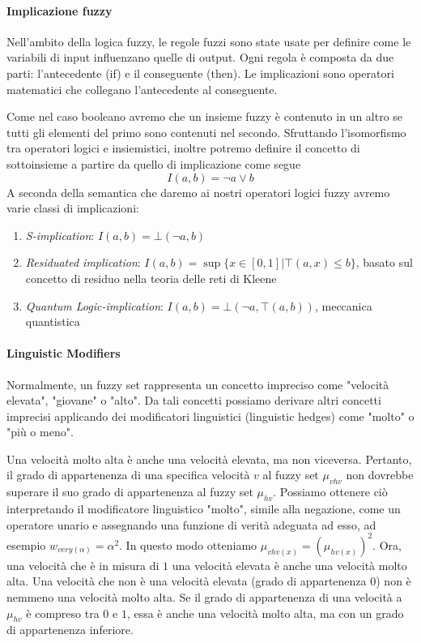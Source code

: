 \paragraph{Implicazione fuzzy}
Nell'ambito della logica fuzzy, le regole fuzzi sono state usate per definire come le variabili di input influenzano quelle di output. Ogni regola è composta da due parti: l'antecedente (if) e il conseguente (then). Le implicazioni sono operatori matematici che collegano l'antecedente al conseguente.

Come nel caso booleano avremo che un insieme fuzzy è contenuto in un altro se tutti gli elementi del primo sono contenuti nel secondo. Sfruttando l’isomorfismo tra operatori logici e insiemistici, inoltre potremo definire il concetto di sottoinsieme a partire da quello di implicazione come segue
$$I(a,b) = \neg a \vee b$$
A seconda della semantica che daremo ai nostri operatori logici fuzzy avremo varie classi di implicazioni:
\begin{enumerate}
    \item{\textit{S-implication}: $I(a,b) = \bot(\neg a, b)$}
    \item{\textit{Residuated implication}: $I(a,b) = \sup \{x \in [0,1] | \top(a,x) \leq b\}$}, basato sul concetto di residuo nella teoria delle reti di Kleene
    \item{\textit{Quantum Logic-implication}: $I(a,b) = \bot(\neg a, \top(a,b))$}, meccanica quantistica
\end{enumerate}

\paragraph{Linguistic Modifiers}
Normalmente, un fuzzy set rappresenta un concetto impreciso come "velocità elevata", "giovane" o "alto". Da tali concetti possiamo derivare altri concetti imprecisi applicando dei modificatori linguistici (linguistic hedges) come "molto" o "più o meno".

Una velocità molto alta è anche una velocità elevata, ma non viceversa. Pertanto, il grado di appartenenza di una specifica velocità $v$ al fuzzy set $\mu_{vhv}$ non dovrebbe superare il suo grado di appartenenza al fuzzy set $\mu_{hv}$. Possiamo ottenere ciò interpretando il modificatore linguistico "molto", simile alla negazione, come un operatore unario e assegnando una funzione di verità adeguata ad esso, ad esempio $w_{very(\alpha)} = \alpha^2$. In questo modo otteniamo $\mu_{vhv(x)} = (\mu_{hv(x)})^2$. Ora, una velocità che è in misura di $1$ una velocità elevata è anche una velocità molto alta. Una velocità che non è una velocità elevata (grado di appartenenza $0$) non è nemmeno una velocità molto alta. Se il grado di appartenenza di una velocità a $\mu_{hv}$ è compreso tra $0$ e $1$, essa è anche una velocità molto alta, ma con un grado di appartenenza inferiore.

